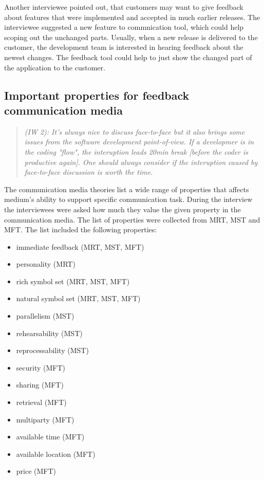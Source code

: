 \documentclass[english,12pt,a4paper,pdftex]{article}
\newcommand{\q}[2]{
\begin{quote}
\emph{(IW #1): #2}
\end{quote}}
\begin{document}
Another interviewee pointed out, that customers may want to give feedback about features that were implemented and accepted in much earlier releases. The interviewee suggested a new feature to commnication tool, which could help scoping out the unchanged parts. Usually, when a new release is delivered to the customer, the development team is interested in hearing feedback about the newest changes. The feedback tool could help to just show the changed part of the application to the customer.

\subsection{Important properties for feedback communication media}

\q{2}{It's always nice to discuss face-to-face but it also brings some issues from the software development point-of-view. If a developmer is in the coding "flow", the interuption leads 20min break [before the coder is productive again]. One should always consider if the interuption caused by face-to-face discussion is worth the time.}

The communication media theories list a wide range of properties that affects medium's ability to support specific communication task. During the interview the interviewees were asked how much they value the given property in the communication media. The list of properties were collected from \ac{MRT}, \ac{MST} and \ac{MFT}. The list included the following properties:

\begin{itemize}
  \item immediate feedback (\acs{MRT}, \acs{MST}, \acs{MFT})
  \item personality (\acs{MRT})
  \item rich symbol set (\acs{MRT}, \acs{MST}, \acs{MFT})
  \item natural symbol set (\acs{MRT}, \acs{MST}, \acs{MFT})
  \item parallelism (\acs{MST})
  \item rehearsability (\acs{MST})
  \item reprocessability (\acs{MST})
  \item security (\acs{MFT})
  \item sharing (\acs{MFT})
  \item retrieval (\acs{MFT})
  \item multiparty (\acs{MFT})
  \item available time (\acs{MFT})
  \item available location (\acs{MFT})
  \item price (\acs{MFT})
\end{itemize}
\end{document}
